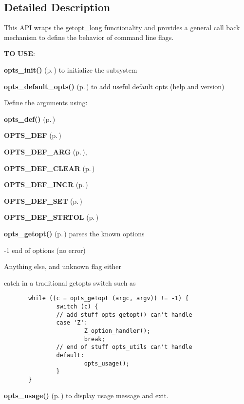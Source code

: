 \subsection{Detailed Description}
This API wraps the getopt\_\-long functionality and provides a general call back mechanism to define the behavior of command line flags.

{\bf TO} {\bf USE}:\begin{CompactItemize}
\item 
{\bf opts\_\-init()} {\rm (p.\,\pageref{group__opts_a0})} to initialize the subsystem \item 
{\bf opts\_\-default\_\-opts()} {\rm (p.\,\pageref{group__opts_a2})} to add useful default opts (help and version)\item 
Define the arguments using:\begin{CompactItemize}
\item 
{\bf opts\_\-def()} {\rm (p.\,\pageref{group__opts_a1})}\item 
{\bf OPTS\_\-DEF} {\rm (p.\,\pageref{opts__utils_8h_a3})} \item 
{\bf OPTS\_\-DEF\_\-ARG} {\rm (p.\,\pageref{opts__utils_8h_a4})}, \item 
{\bf OPTS\_\-DEF\_\-CLEAR} {\rm (p.\,\pageref{opts__utils_8h_a6})} \item 
{\bf OPTS\_\-DEF\_\-INCR} {\rm (p.\,\pageref{opts__utils_8h_a7})} \item 
{\bf OPTS\_\-DEF\_\-SET} {\rm (p.\,\pageref{opts__utils_8h_a8})} \item 
{\bf OPTS\_\-DEF\_\-STRTOL} {\rm (p.\,\pageref{opts__utils_8h_a5})} \end{CompactItemize}
\item 
{\bf opts\_\-getopt()} {\rm (p.\,\pageref{group__opts_a3})} parses the known options\begin{CompactItemize}
\item 
-1 end of options (no error)\item 
Anything else, and unknown flag either\begin{CompactItemize}
\item 
catch in a traditional getopts switch such as 

\footnotesize\begin{verbatim}       while ((c = opts_getopt (argc, argv)) != -1) {
               switch (c) {
               // add stuff opts_getopt() can't handle
               case 'Z':
                       Z_option_handler();
                       break;
               // end of stuff opts_utils can't handle 
               default:
                       opts_usage();
               }
       }
\end{verbatim}\normalsize 
\item 
{\bf opts\_\-usage()} {\rm (p.\,\pageref{group__opts_a4})} to display usage message and exit.\end{CompactItemize}
\end{CompactItemize}
\end{CompactItemize}
